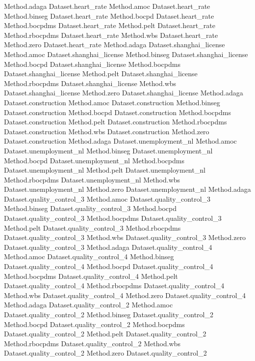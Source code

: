 Method.adaga Dataset.heart_rate
Method.amoc Dataset.heart_rate
Method.binseg Dataset.heart_rate
Method.bocpd Dataset.heart_rate
Method.bocpdms Dataset.heart_rate
Method.pelt Dataset.heart_rate
Method.rbocpdms Dataset.heart_rate
Method.wbs Dataset.heart_rate
Method.zero Dataset.heart_rate
Method.adaga Dataset.shanghai_license
Method.amoc Dataset.shanghai_license
Method.binseg Dataset.shanghai_license
Method.bocpd Dataset.shanghai_license
Method.bocpdms Dataset.shanghai_license
Method.pelt Dataset.shanghai_license
Method.rbocpdms Dataset.shanghai_license
Method.wbs Dataset.shanghai_license
Method.zero Dataset.shanghai_license
Method.adaga Dataset.construction
Method.amoc Dataset.construction
Method.binseg Dataset.construction
Method.bocpd Dataset.construction
Method.bocpdms Dataset.construction
Method.pelt Dataset.construction
Method.rbocpdms Dataset.construction
Method.wbs Dataset.construction
Method.zero Dataset.construction
Method.adaga Dataset.unemployment_nl
Method.amoc Dataset.unemployment_nl
Method.binseg Dataset.unemployment_nl
Method.bocpd Dataset.unemployment_nl
Method.bocpdms Dataset.unemployment_nl
Method.pelt Dataset.unemployment_nl
Method.rbocpdms Dataset.unemployment_nl
Method.wbs Dataset.unemployment_nl
Method.zero Dataset.unemployment_nl
Method.adaga Dataset.quality_control_3
Method.amoc Dataset.quality_control_3
Method.binseg Dataset.quality_control_3
Method.bocpd Dataset.quality_control_3
Method.bocpdms Dataset.quality_control_3
Method.pelt Dataset.quality_control_3
Method.rbocpdms Dataset.quality_control_3
Method.wbs Dataset.quality_control_3
Method.zero Dataset.quality_control_3
Method.adaga Dataset.quality_control_4
Method.amoc Dataset.quality_control_4
Method.binseg Dataset.quality_control_4
Method.bocpd Dataset.quality_control_4
Method.bocpdms Dataset.quality_control_4
Method.pelt Dataset.quality_control_4
Method.rbocpdms Dataset.quality_control_4
Method.wbs Dataset.quality_control_4
Method.zero Dataset.quality_control_4
Method.adaga Dataset.quality_control_2
Method.amoc Dataset.quality_control_2
Method.binseg Dataset.quality_control_2
Method.bocpd Dataset.quality_control_2
Method.bocpdms Dataset.quality_control_2
Method.pelt Dataset.quality_control_2
Method.rbocpdms Dataset.quality_control_2
Method.wbs Dataset.quality_control_2
Method.zero Dataset.quality_control_2

